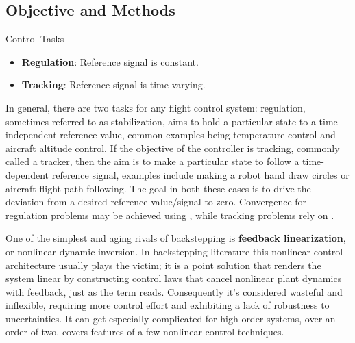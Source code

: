 \documentclass[12pt]{ucthesis}
\begin{document}
\subsection{Objective and Methods}
\label{subsec: objective}

\begin{defn}Control Tasks 
	\begin{itemize}[labelindent=\parindent,leftmargin=\parindent,noitemsep,topsep=0pt,parsep=0pt,partopsep=0pt]%
		\item \textbf{Regulation}: Reference signal is constant. %
		\item \textbf{Tracking}: Reference signal is time-varying. %
	\end{itemize}
	\label{defn: control_tasks}
\end{defn}%

In general, there are two tasks for any flight control system: regulation, sometimes referred to as stabilization, aims to hold a particular state to a time-independent reference value, common examples being temperature control and aircraft altitude control. If the objective of the controller is tracking, commonly called a tracker, then the aim is to make a particular state to follow a time-dependent reference signal, examples include making a robot hand draw circles or aircraft flight path following. The goal in both these cases is to drive the deviation from a desired reference value/signal to zero. Convergence for regulation problems may be achieved using , while tracking problems rely on .

One of the simplest and aging rivals of backstepping is \textbf{feedback linearization}, or nonlinear dynamic inversion. In backstepping literature this nonlinear control architecture usually plays the victim; it is a point solution that renders the system linear by constructing control laws that cancel nonlinear plant dynamics with feedback, just as the term reads. Consequently it's considered wasteful and inflexible, requiring more control effort and exhibiting a lack of robustness to uncertainties. It can get especially complicated for high order systems, over an order of two.  covers features of a few nonlinear control techniques.
\end{document}
